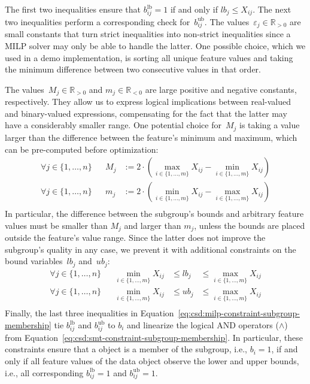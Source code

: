 \documentclass{article}
\theoremstyle{definition}
\begin{document}
%
The first two inequalities ensure that $b^{\text{lb}}_{ij} = 1$ if and only if $\mathit{lb}_j \leq X_{ij}$.
The next two inequalities perform a corresponding check for~$b^{\text{ub}}_{ij}$.
The values~$\varepsilon_j \in \mathbb{R}_{> 0}$ are small constants that turn strict inequalities into non-strict inequalities since a MILP solver may only be able to handle the latter.
One possible choice, which we used in a demo implementation, is sorting all unique feature values and taking the minimum difference between two consecutive values in that order.

The values~$M_j \in \mathbb{R}_{> 0}$ and $m_j \in \mathbb{R}_{< 0}$ are large positive and negative constants, respectively.
They allow us to express logical implications between real-valued and binary-valued expressions, compensating for the fact that the latter may have a considerably smaller range.
One potential choice for~$M_j$ is taking a value larger than the difference between the feature's minimum and maximum, which can be pre-computed before optimization:
%
\begin{equation}
	\begin{aligned}
		\forall j \in \{1, \dots, n\} & & M_j &:= 2 \cdot \left( \max_{i \in \{1, \dots, m\}} X_{ij} - \min_{i \in \{1, \dots, m\}} X_{ij} \right) \\
		\forall j \in \{1, \dots, n\} & & m_j &:= 2 \cdot \left( \min_{i \in \{1, \dots, m\}} X_{ij} - \max_{i \in \{1, \dots, m\}} X_{ij} \right) \\
	\end{aligned}
	\label{eq:csd:milp-big-m}
\end{equation}
%
In particular, the difference between the subgroup's bounds and arbitrary feature values must be smaller than $M_j$ and larger than $m_j$, unless the bounds are placed outside the feature's value range.
Since the latter does not improve the subgroup's quality in any case, we prevent it with additional constraints on the bound variables~$\mathit{lb}_j$ and~$\mathit{ub}_j$:
%
\begin{equation}
	\begin{aligned}
		\forall j \in \{1, \dots, n\} & & \min_{i \in \{1, \dots, m\}} X_{ij} &\leq \mathit{lb}_j &\leq \max_{i \in \{1, \dots, m\}} X_{ij} \\
		\forall j \in \{1, \dots, n\} & & \min_{i \in \{1, \dots, m\}} X_{ij} &\leq \mathit{ub}_j &\leq \max_{i \in \{1, \dots, m\}} X_{ij} \\
	\end{aligned}
	\label{eq:csd:milp-constraint-bounds-in-range}
\end{equation}
%
Finally, the last three inequalities in Equation~\ref{eq:csd:milp-constraint-subgroup-membership} tie $b^{\text{lb}}_{ij}$ and $b^{\text{ub}}_{ij}$ to $b_i$ and linearize the logical AND operators ($\land$) from Equation~\ref{eq:csd:smt-constraint-subgroup-membership}.
In particular, these constraints ensure that a object is a member of the subgroup, i.e., $b_i = 1$, if and only if all feature values of the data object observe the lower and upper bounds, i.e., all corresponding $b^{\text{lb}}_{ij} = 1$ and $b^{\text{ub}}_{ij} = 1$.
\end{document}
